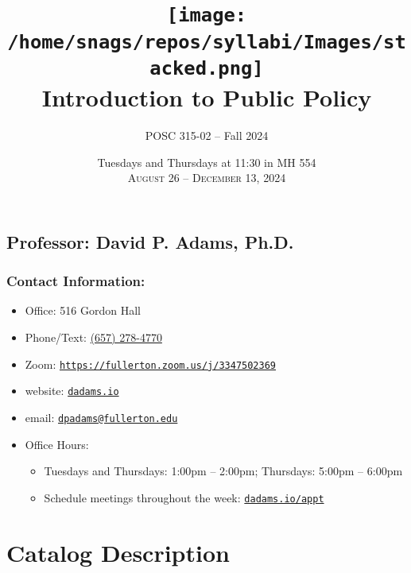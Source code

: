 \documentclass[12pt, letterpaper]{article}
\begin{document}
\title{\texttt{[image: /home/snags/repos/syllabi/Images/stacked.png]} \\\vspace{1ex} \textbf{Introduction to Public Policy}}

\author{POSC 315-02 -- Fall 2024}
\date{Tuesdays and Thursdays at 11:30 in MH 554 \\\vspace{2ex} \textsc{August 26 -- December 13, 2024}}

    \maketitle


\subsection*{Professor: David P. Adams, Ph.D.}

\subsubsection*{Contact Information:}

\begin{itemize}
	\item Office: 516 Gordon Hall
	\item Phone/Text: \href{tel:+16572784770}{(657) 278-4770}
	\item Zoom: \href{https://fullerton.zoom.us/j/3347502369}{\texttt{https://fullerton.zoom.us/j/3347502369}}
	\item website: \href{https://dadams.io}{\texttt{dadams.io}}
	\item email: \href{dpadams@fullerton.edu}{\texttt{dpadams@fullerton.edu}}
	\item Office Hours:
        \begin{itemize}
            \item Tuesdays and Thursdays: 1:00pm -- 2:00pm; Thursdays: 5:00pm -- 6:00pm
            \item Schedule meetings throughout the week: \href{https://dadams.io/appt}{\texttt{dadams.io/appt}}
        \end{itemize}  
\end{itemize}


\section{Catalog Description}
\end{document}
